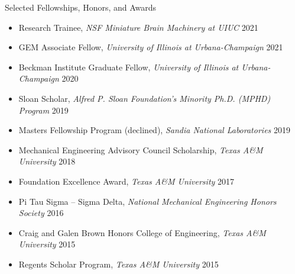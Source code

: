 \documentclass[11pt]{resume} %
\begin{document}
\begin{rSection}{Selected Fellowships, Honors, and Awards}
\begin{itemize}[label={}]
    \setlength\itemsep{0em}
    \item Research Trainee, \textit{NSF Miniature Brain Machinery at UIUC} \hfill 2021
    \item GEM Associate Fellow, \textit{University of Illinois at Urbana-Champaign} \hfill 2021
    \item Beckman Institute Graduate Fellow, \textit{University of Illinois at Urbana-Champaign} \hfill 2020
    \item Sloan Scholar, \textit{Alfred P. Sloan Foundation's Minority Ph.D. (MPHD) Program} \hfill 2019
    \item Masters Fellowship Program (declined), \textit{Sandia National Laboratories} \hfill 2019
    \item Mechanical Engineering Advisory Council Scholarship, \textit{Texas A\&M University} \hfill 2018
    \item Foundation Excellence Award, \textit{Texas A\&M University} \hfill 2017
    \item Pi Tau Sigma -- Sigma Delta, \textit{National Mechanical Engineering Honors Society} \hfill 2016
    \item Craig and Galen Brown Honors College of Engineering, \textit{Texas A\&M University} \hfill 2015
    \item Regents Scholar Program, \textit{Texas A\&M University} \hfill 2015
\end{itemize}
\end{rSection}

\end{document}
